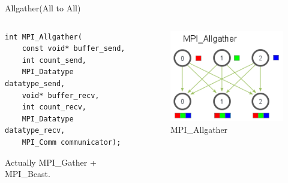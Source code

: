 \begin{frame}[fragile]{Allgather(All to All)}
    \begin{columns}
    
\begin{column}{.5\textwidth}
\begin{verbatim}
int MPI_Allgather(
    const void* buffer_send,
    int count_send,
    MPI_Datatype datatype_send,
    void* buffer_recv,
    int count_recv,
    MPI_Datatype datatype_recv,
    MPI_Comm communicator);
\end{verbatim}

Actually MPI\_Gather + MPI\_Bcast.

\end{column}

\begin{column}{.5\textwidth}
\begin{figure}
    \centering
    \includegraphics[width=0.75\linewidth]{day8_am/img/mpi/allgather.png}
    \caption{MPI\_Allgather}
    \label{fig:enter-label}
\end{figure}
\end{column}
\end{columns}
\end{frame}

